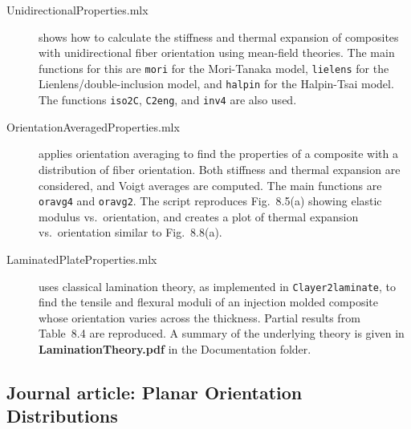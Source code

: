 \documentclass[11pt]{article}
\begin{document}
\begin{description}

    \item[UnidirectionalProperties.mlx]{shows how to calculate the stiffness and thermal expansion of composites with unidirectional fiber orientation using mean-field theories.  The main functions for this are \texttt{mori} for the Mori-Tanaka model, \texttt{lielens} for the Lienlens/double-inclusion model, and \texttt{halpin} for the Halpin-Tsai model.  The functions \texttt{iso2C}, \texttt{C2eng}, and \texttt{inv4} are also used.}
    
    \item[OrientationAveragedProperties.mlx]{applies orientation averaging to find the properties of a composite with a distribution of fiber orientation.  Both stiffness and thermal expansion are considered, and Voigt averages are computed.  The main functions are \texttt{oravg4} and \texttt{oravg2}.  The script reproduces Fig.~8.5(a) showing elastic modulus vs.\ orientation, and creates a plot of thermal expansion vs.\ orientation similar to Fig.~8.8(a).}
        
    \item[LaminatedPlateProperties.mlx]{uses classical lamination theory, as implemented in \break \texttt{Clayer2laminate}, to find the tensile and flexural moduli of an injection molded composite whose orientation varies across the thickness.  Partial results from Table~8.4 are reproduced.  A summary of the underlying theory is given in \textbf{LaminationTheory.pdf} in the Documentation folder.}
\end{description}



\subsection*{Journal article: Planar Orientation Distributions}
\end{document}
